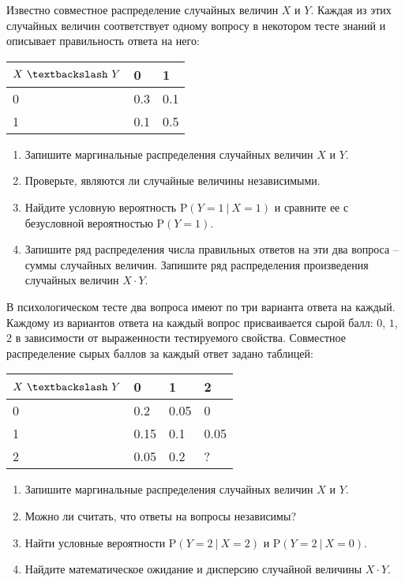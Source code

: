 \documentclass[a4paper, 12pt]{article}
\begin{document}
\begin{problem}
Известно совместное распределение случайных величин $X$ и $Y$. 
Каждая из этих случайных величин соответствует одному вопросу в 
некотором тесте знаний и описывает правильность ответа на него: 
\begin{table}[h!]
\centering
\begin{tabular}{|l|l|l|}
\hline
$X~\textbackslash~Y$	& 0 & 1 \\ \hline
0	& 0.3 & 0.1 \\ \hline
1	& 0.1 & 0.5 \\ \hline
\end{tabular}
\end{table}


\begin{enumerate}
\item Запишите маргинальные распределения случайных величин $X$ и $Y$.
\item Проверьте, являются ли случайные величины независимыми. 
\item Найдите условную вероятность $\text{P}(Y=1~|~X=1)$ и сравните ее с 
безусловной вероятностью $\text{P}(Y=1)$. 
\item Запишите ряд распределения числа правильных ответов на эти два вопроса -- 
суммы случайных величин. Запишите ряд распределения произведения случайных величин $X \cdot Y$.
\end{enumerate}
\end{problem}

\begin{problem}
В психологическом тесте два  вопроса имеют по три варианта 
ответа на каждый. Каждому из вариантов ответа на каждый вопрос 
присваивается сырой балл: $0$, $1$, $2$ в зависимости от выраженности 
тестируемого свойства. Совместное распределение сырых баллов за 
каждый ответ  задано таблицей:
		
\begin{table}[ht!]
\centering
\begin{tabular}{|l|l|l|l|}
	\hline
	$X~\textbackslash~Y$	& 0 & 1 & 2 \\ \hline
	0	& 0.2 & 0.05 & 0 \\ \hline
	1	& 0.15 & 0.1 & 0.05 \\ \hline
	2	& 0.05 & 0.2 & ? \\ \hline
\end{tabular}
\end{table}

\begin{enumerate}
\item Запишите маргинальные распределения случайных величин $X$ и $Y$.
\item Можно ли считать, что ответы на вопросы независимы? 
\item Найти условные вероятности $\text{P}(Y=2~|~X=2)$ и $\text{P}(Y=2~|~X=0)$. 
\item Найдите математическое ожидание и дисперсию случайной величины $X\cdot Y$.
\end{enumerate}

\end{problem}
\end{document}

